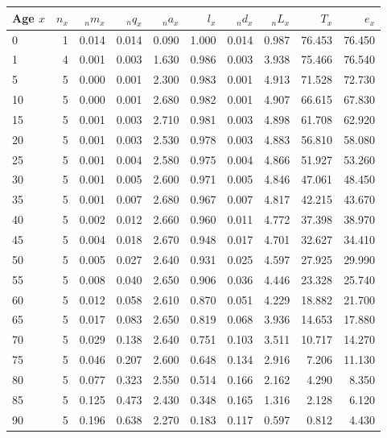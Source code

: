 \documentclass[11pt,letterpaper]{article}
\theoremstyle{plain}
\begin{document}
\begin{table}[htbp]
\centering
\begin{tabular}{lrrrrrrrrr}
  \toprule
Age $x$ & $n_x$ & $_nm_x$ & $_nq_x$& $_na_x$ & $l_x$ & $_nd_x$ & $_nL_x$ & $T_x$ & $e_x$ \\ 
  \midrule
0 & 1 & 0.014 & 0.014 & 0.090 & 1.000 & 0.014 & 0.987 & 76.453 & 76.450 \\ 
  1 & 4 & 0.001 & 0.003 & 1.630 & 0.986 & 0.003 & 3.938 & 75.466 & 76.540 \\ 
  5 & 5 & 0.000 & 0.001 & 2.300 & 0.983 & 0.001 & 4.913 & 71.528 & 72.730 \\ 
  10 & 5 & 0.000 & 0.001 & 2.680 & 0.982 & 0.001 & 4.907 & 66.615 & 67.830 \\ 
  15 & 5 & 0.001 & 0.003 & 2.710 & 0.981 & 0.003 & 4.898 & 61.708 & 62.920 \\ 
  20 & 5 & 0.001 & 0.003 & 2.530 & 0.978 & 0.003 & 4.883 & 56.810 & 58.080 \\ 
  25 & 5 & 0.001 & 0.004 & 2.580 & 0.975 & 0.004 & 4.866 & 51.927 & 53.260 \\ 
  30 & 5 & 0.001 & 0.005 & 2.600 & 0.971 & 0.005 & 4.846 & 47.061 & 48.450 \\ 
  35 & 5 & 0.001 & 0.007 & 2.680 & 0.967 & 0.007 & 4.817 & 42.215 & 43.670 \\ 
  40 & 5 & 0.002 & 0.012 & 2.660 & 0.960 & 0.011 & 4.772 & 37.398 & 38.970 \\ 
  45 & 5 & 0.004 & 0.018 & 2.670 & 0.948 & 0.017 & 4.701 & 32.627 & 34.410 \\ 
  50 & 5 & 0.005 & 0.027 & 2.640 & 0.931 & 0.025 & 4.597 & 27.925 & 29.990 \\ 
  55 & 5 & 0.008 & 0.040 & 2.650 & 0.906 & 0.036 & 4.446 & 23.328 & 25.740 \\ 
  60 & 5 & 0.012 & 0.058 & 2.610 & 0.870 & 0.051 & 4.229 & 18.882 & 21.700 \\ 
  65 & 5 & 0.017 & 0.083 & 2.650 & 0.819 & 0.068 & 3.936 & 14.653 & 17.880 \\ 
  70 & 5 & 0.029 & 0.138 & 2.640 & 0.751 & 0.103 & 3.511 & 10.717 & 14.270 \\ 
  75 & 5 & 0.046 & 0.207 & 2.600 & 0.648 & 0.134 & 2.916 & 7.206 & 11.130 \\ 
  80 & 5 & 0.077 & 0.323 & 2.550 & 0.514 & 0.166 & 2.162 & 4.290 & 8.350 \\ 
  85 & 5 & 0.125 & 0.473 & 2.430 & 0.348 & 0.165 & 1.316 & 2.128 & 6.120 \\ 
  90 & 5 & 0.196 & 0.638 & 2.270 & 0.183 & 0.117 & 0.597 & 0.812 & 4.430 \\ 

\end{tabular}
\end{table}
\end{document}
